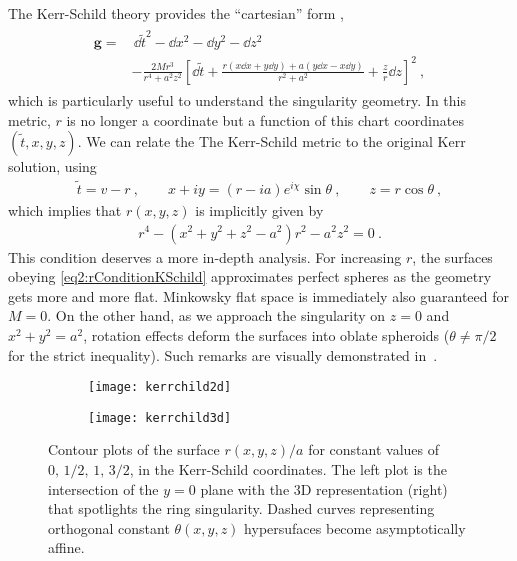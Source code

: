 The Kerr-Schild theory provides the ``cartesian'' form \cite{Teukolsky2015}, 
\begin{align}
    \label{eq2:KerrSchild}
    \begin{split}
        \bm{g} = & \, \dd \tilde{t}^2 - \dd x^2 - \dd y^2 - \dd z^2 \\
        & - \frac{2 M r^3}{r^4 + a^2 z^2} \left[ \dd \tilde{t} + \frac{r (x \dd x + y \dd y) + a ( y \dd x - x \dd y)}{r^2+a^2} + \frac{z}{r} \dd z \right]^2 ~,
    \end{split}
\end{align}
which is particularly useful to understand the singularity geometry.
In this metric, $r$ is no longer a coordinate but a function of this chart coordinates $(\tilde{t},x,y,z)$.
We can relate the The Kerr-Schild metric to the original Kerr solution, using
\begin{align}
    \label{eq2:InEFtoKSchild}
    \tilde{t} = v - r ~, \qquad x+ i y = (r -i a) e^{i \chi} \sin\theta ~,\qquad z=r\cos\theta ~,
\end{align}
which implies that $r(x,y,z)$ is implicitly given by
\begin{align}
    \label{eq2:rConditionKSchild}
    r^4 - (x^2+y^2+z^2-a^2)r^2 -a^2 z^2 = 0 ~.
\end{align}
This condition deserves a more in-depth analysis.
For increasing $r$, the surfaces obeying \eqref{eq2:rConditionKSchild} approximates perfect spheres as the geometry gets more and more flat.
Minkowsky flat space is immediately also guaranteed for $M=0$.
On the other hand, as we approach the singularity on $z=0$ and $x^2+y^2 = a^2$, rotation effects deform the surfaces into oblate spheroids ($\theta\ne\pi/2$ for the strict inequality).
Such remarks are visually demonstrated in~.

\begin{figure}[h]
    \centering
    \begin{subfigure}[c]{0.45\textwidth}
        \texttt{[image: kerrchild2d]}
    \end{subfigure}
    \hspace{1cm}
    \begin{subfigure}[c]{0.35\textwidth}
        \texttt{[image: kerrchild3d]}
    \end{subfigure}
    \caption{Contour plots of the surface $r(x,y,z)/a$ for constant values of $0,\,1/2,\,1,\,3/2$, in the Kerr-Schild coordinates. The left plot is the intersection of the $y=0$ plane with the 3D representation (right) that spotlights the ring singularity. Dashed curves representing orthogonal constant $\theta(x,y,z)$ hypersufaces become asymptotically affine.}\label{fig2:kerrchild}
\end{figure}

